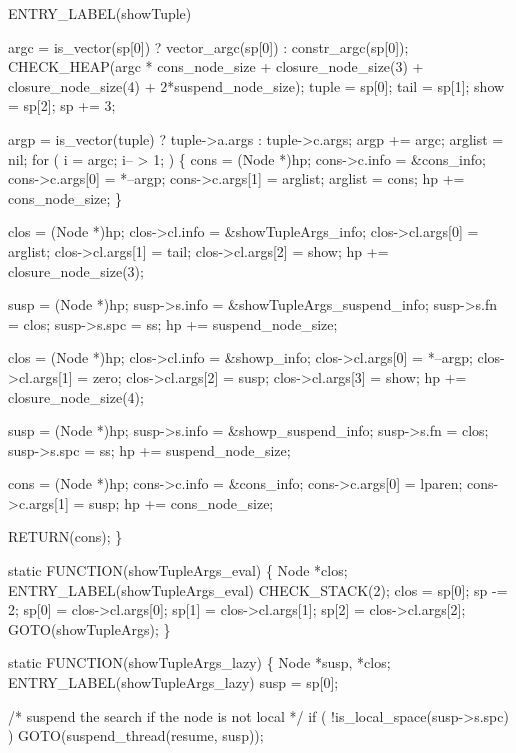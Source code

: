  ENTRY_LABEL(showTuple)

    argc = is_vector(sp[0]) ? vector_argc(sp[0]) : constr_argc(sp[0]);
    CHECK_HEAP(argc * cons_node_size + closure_node_size(3)
               + closure_node_size(4) + 2*suspend_node_size);
    tuple = sp[0];
    tail  = sp[1];
    show  = sp[2];
    sp   += 3;

    argp    = is_vector(tuple) ? tuple->a.args : tuple->c.args;
    argp   += argc;
    arglist = nil;
    for ( i = argc; i-- > 1; )
    \{
        cons            = (Node *)hp;
        cons->c.info    = &cons_info;
        cons->c.args[0] = *--argp;
        cons->c.args[1] = arglist;
        arglist         = cons;
        hp             += cons_node_size;
    \}

    clos             = (Node *)hp;
    clos->cl.info    = &showTupleArgs_info;
    clos->cl.args[0] = arglist;
    clos->cl.args[1] = tail;
    clos->cl.args[2] = show;
    hp              += closure_node_size(3);

    susp         = (Node *)hp;
    susp->s.info = &showTupleArgs_suspend_info;
    susp->s.fn   = clos;
    susp->s.spc  = ss;
    hp          += suspend_node_size;

    clos             = (Node *)hp;
    clos->cl.info    = &showp_info;
    clos->cl.args[0] = *--argp;
    clos->cl.args[1] = zero;
    clos->cl.args[2] = susp;
    clos->cl.args[3] = show;
    hp              += closure_node_size(4);

    susp         = (Node *)hp;
    susp->s.info = &showp_suspend_info;
    susp->s.fn   = clos;
    susp->s.spc  = ss;
    hp          += suspend_node_size;

    cons            = (Node *)hp;
    cons->c.info    = &cons_info;
    cons->c.args[0] = lparen;
    cons->c.args[1] = susp;
    hp             += cons_node_size;

    RETURN(cons);
\}

static
FUNCTION(showTupleArgs_eval)
\{
    Node *clos;
 ENTRY_LABEL(showTupleArgs_eval)
    CHECK_STACK(2);
    clos  = sp[0];
    sp   -= 2;
    sp[0] = clos->cl.args[0];
    sp[1] = clos->cl.args[1];
    sp[2] = clos->cl.args[2];
    GOTO(showTupleArgs);
\}

static
FUNCTION(showTupleArgs_lazy)
\{
    Node *susp, *clos;
 ENTRY_LABEL(showTupleArgs_lazy)
    susp = sp[0];

    /* suspend the search if the node is not local */
    if ( !is_local_space(susp->s.spc) )
        GOTO(suspend_thread(resume, susp));

